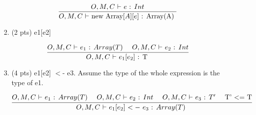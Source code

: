 \documentclass[10pt]{article}
\newcommand{\infertext}[2]{\infer{{\textrm{#1}}}{#2}}
\begin{document}
\begin{enumerate}
\begin{enumerate}
\begin{enumerate}
	
\[\infertext
      {$O,M,C$ $\vdash$ new Array$[A][e]$ : Array(A) }
      {\textrm{$O,M,C$ $\vdash$ $e$ : $Int$}
      }
    \]


    \item (2 pts) \textsf{e1[e2]}
\newline

	
\[\infertext
      {$O,M,C$ $\vdash$ $e_1[e_2]$ : T }
      {\textrm{$O,M,C$ $\vdash$ $e_1$ : $Array(T)$}
      \ \ \ \ 	\textrm{$O,M,C$ $\vdash$ $e_2$ : $Int$}
      }
    \]

    \item (4 pts) \textsf{e1[e2] $<$- e3}. Assume the type of the whole expression is the type of \textsf{e1}.
\newline

\[\infertext
      {$O,M,C$ $\vdash$ $e_1[e_2]$ $<-$  $e_3$ : $Array(T)$ }
      {\textrm{$O,M,C$ $\vdash$ $e_1$ : $Array(T)$}
      \ \ \ \ 	\textrm{$O,M,C$ $\vdash$ $e_2$ : $Int$}
      \ \ \ \ 	\textrm{$O,M,C$ $\vdash$ $e_3$ : $T'$}
      \ \ \ \   \textrm{T' $<=$ T}
      }
    \]
\end{enumerate}
\end{enumerate}
\end{enumerate}
\end{document}
